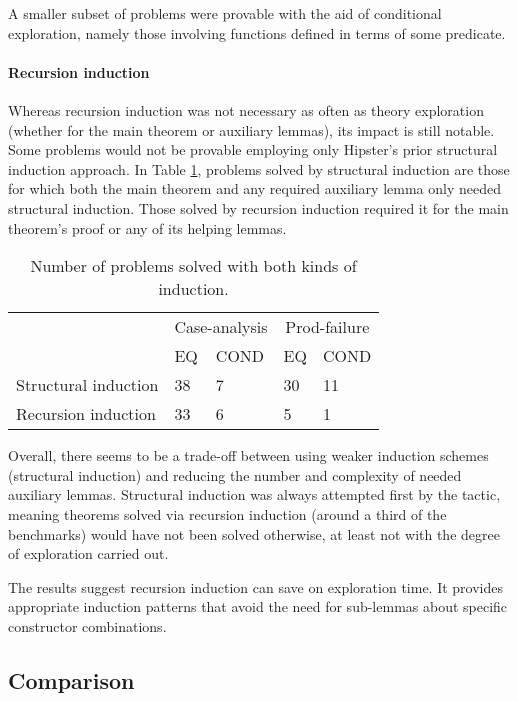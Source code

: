 A smaller subset of problems were provable with the aid of conditional exploration, namely those involving functions defined in terms of some predicate.

\paragraph{Recursion induction}

Whereas recursion induction was not necessary as often as theory exploration (whether for the main theorem or auxiliary lemmas), its impact is still notable.
%
Some problems would not be provable employing only Hipster's prior structural induction approach.
%
In Table \ref{tab:rec-ind}, problems solved by structural induction are those for which both the main theorem and any required auxiliary lemma only needed structural induction. Those solved by recursion induction required it for the main theorem's proof or any of its helping lemmas. %
%

\noindent \begin{table}[h]
\begin{tabularx}{\textwidth}{l | X X | X X}
  & \multicolumn{2}{c|}{Case-analysis} & \multicolumn{2}{c}{Prod-failure} \\
  &  EQ & COND & EQ & COND \\
  \hline
  Structural induction & 38 & 7 & 30 & 11 \\
  Recursion induction & 33 & 6 & 5 & 1 \\
\end{tabularx}
\caption{Number of problems solved with both kinds of induction.}
\label{tab:rec-ind}
\end{table}

Overall, there seems to be a trade-off between using weaker induction schemes (structural induction) and reducing the number and complexity of needed auxiliary lemmas.
%
Structural induction was always attempted first by the tactic, meaning theorems solved via recursion induction (around a third of the benchmarks) would have not been solved otherwise, at least not with the degree of exploration carried out.
 
The results suggest recursion induction can save on exploration time.
%
It provides appropriate induction patterns that avoid the need for sub-lemmas about specific constructor combinations.


\subsection{Comparison}

